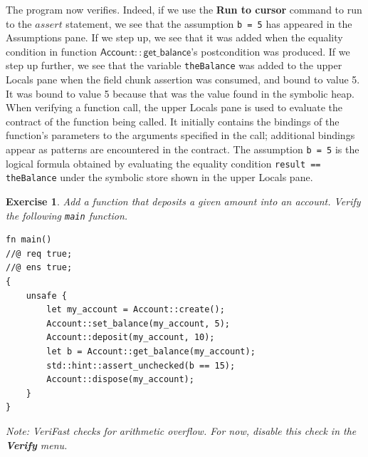 \documentclass{article}
\newtheorem{exercise}{Exercise}
\begin{document}
The program now verifies. Indeed, if we use the \textbf{Run to
cursor} command to run to the $\mathit{assert}$ statement, we
see that the assumption \lstinline!b = 5! has appeared in the
Assumptions pane. If we step up, we see that it was added when
the equality condition in function
$\mathsf{Account{::}get\_balance}$'s postcondition was produced.
If we step up further, we see that the variable
\lstinline!theBalance! was added to the upper Locals pane when
the field chunk assertion was consumed, and bound to value 5.
It was bound to value 5 because that was the value found in the
symbolic heap. When verifying a function call, the upper Locals
pane is used to evaluate the contract of the function being
called. It initially contains the bindings of the function's
parameters to the arguments specified in the call; additional
bindings appear as patterns are encountered in the contract.
The assumption \lstinline!b = 5! is the logical formula
obtained by evaluating the equality condition %
\lstinline!result == theBalance! under the symbolic store shown
in the upper Locals pane.

\begin{exercise}\label{exercise:deposit}
Add a function that deposits a given amount into an account.
Verify the following \lstinline!main! function.
\begin{lstlisting}[basicstyle=\ttfamily\upshape]
fn main()
//@ req true;
//@ ens true;
{
    unsafe {
        let my_account = Account::create();
        Account::set_balance(my_account, 5);
        Account::deposit(my_account, 10);
        let b = Account::get_balance(my_account);
        std::hint::assert_unchecked(b == 15);
        Account::dispose(my_account);
    }
}
\end{lstlisting}
Note: VeriFast checks for arithmetic overflow. For now, disable
this check in the \textbf{Verify} menu.
\end{exercise}
\end{document}
